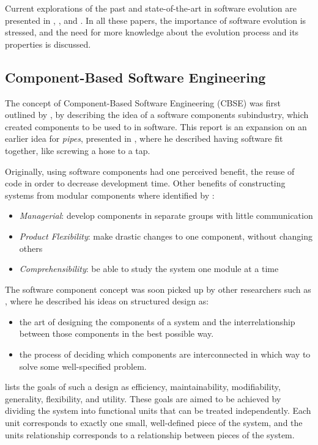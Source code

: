 Current explorations of the past and state-of-the-art in software evolution are presented in \citep{Bennett2000}, \citep{Lehman2003}, and \citep{Godfrey2008}.
In all these papers, the importance of software evolution is stressed, and the need for more knowledge about the evolution process and its properties is discussed.

\subsection{Component-Based Software Engineering}
The concept of Component-Based Software Engineering (CBSE) was first outlined by \cite{McIlroy1969}, 
by describing the idea of a software components subindustry, which created components to be used to in software.
This report is an expansion on an earlier idea for \textit{pipes}, presented in \citep{mcilroy1964pipes}, 
where he described having software fit together, like screwing a hose to a tap.

Originally, using software components had one perceived benefit, the reuse of code in order to decrease development time.
Other benefits of constructing systems from modular components where identified by \cite{Parnas1972}:
\begin{itemize}
  \item \textit{Managerial}: develop components in separate groups with little communication
  \item \textit{Product Flexibility}: make drastic changes to one component, without changing others
  \item \textit{Comprehensibility}: be able to study the system one module at a time
\end{itemize}

The software component concept was soon picked up by other researchers such as \cite{Yourdon1976}, where he described his ideas on structured design as:
\begin{itemize}
  \item the art of designing the components of a system and the interrelationship between those components in the best possible way.
  \item the process of deciding which components are interconnected in which way to solve some well-specified problem.
\end{itemize}
\cite{Yourdon1976} lists the goals of such a design as efficiency, maintainability, modifiability, generality, flexibility, and utility.
These goals are aimed to be achieved by dividing the system into functional units that can be treated independently.
Each unit corresponds to exactly one small, well-defined piece of the system, and the units relationship corresponds to a relationship between pieces of the system.

